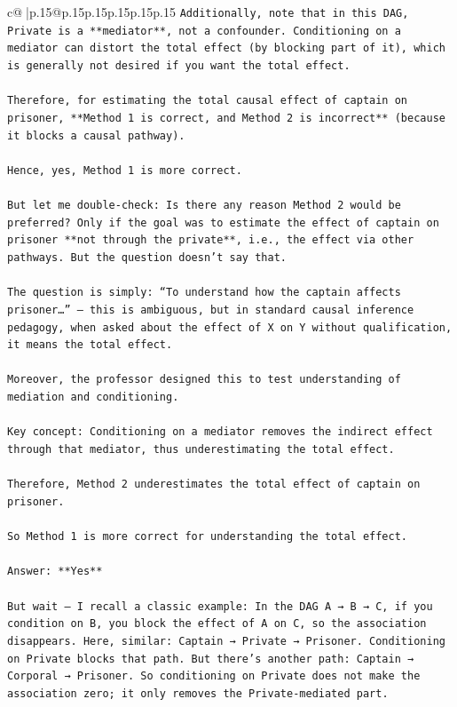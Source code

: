 \documentclass{article}
\begin{document}
{\begin{supertabular}{c@{$\;$}|p{.15\linewidth}@{}p{.15\linewidth}p{.15\linewidth}p{.15\linewidth}p{.15\linewidth}p{.15\linewidth}}
{{{\texttt{Additionally, note that in this DAG, Private is a **mediator**, not a confounder. Conditioning on a mediator can distort the total effect (by blocking part of it), which is generally not desired if you want the total effect.} \\
\\ 
\texttt{Therefore, for estimating the total causal effect of captain on prisoner, **Method 1 is correct, and Method 2 is incorrect** (because it blocks a causal pathway).} \\
\\ 
\texttt{Hence, yes, Method 1 is more correct.} \\
\\ 
\texttt{But let me double{-}check: Is there any reason Method 2 would be preferred? Only if the goal was to estimate the effect of captain on prisoner **not through the private**, i.e., the effect via other pathways. But the question doesn’t say that.} \\
\\ 
\texttt{The question is simply: “To understand how the captain affects prisoner…” — this is ambiguous, but in standard causal inference pedagogy, when asked about the effect of X on Y without qualification, it means the total effect.} \\
\\ 
\texttt{Moreover, the professor designed this to test understanding of mediation and conditioning.} \\
\\ 
\texttt{Key concept: Conditioning on a mediator removes the indirect effect through that mediator, thus underestimating the total effect.} \\
\\ 
\texttt{Therefore, Method 2 underestimates the total effect of captain on prisoner.} \\
\\ 
\texttt{So Method 1 is more correct for understanding the total effect.} \\
\\ 
\texttt{Answer: **Yes**} \\
\\ 
\texttt{But wait — I recall a classic example: In the DAG A → B → C, if you condition on B, you block the effect of A on C, so the association disappears. Here, similar: Captain → Private → Prisoner. Conditioning on Private blocks that path. But there’s another path: Captain → Corporal → Prisoner. So conditioning on Private does not make the association zero; it only removes the Private{-}mediated part.} \\
}}}
\end{supertabular}}
\end{document}
